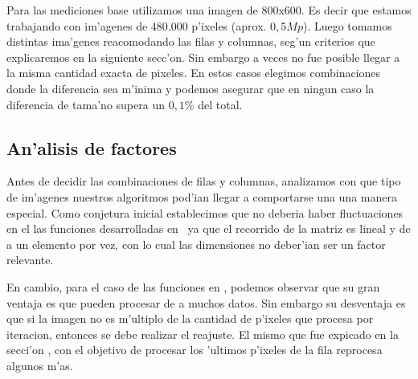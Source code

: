 Para las mediciones base utilizamos una imagen de 800x600. Es decir que estamos trabajando con im'agenes de 480.000 p'ixeles (aprox. $0,5Mp$). Luego tomamos distintas ima'genes reacomodando las filas y columnas, seg'un criterios que explicaremos en la siguiente secc'on. Sin embargo a veces no fue posible llegar a la misma cantidad exacta de pixeles. En estos casos elegimos combinaciones donde la diferencia sea m'inima y podemos asegurar que en ningun caso la diferencia de tama'no supera un $0,1\%$ del total.

\subsection{An'alisis de factores}
Antes de decidir las combinaciones de filas y columnas, analizamos con que tipo de im'agenes nuestros algoritmos pod'ian
llegar a comportarse una una manera especial. Como conjetura inicial establecimos que no deberia haber 
fluctuaciones en el las funciones desarrolladas en \C \ ya que el recorrido de la matriz es lineal y
de a un elemento por vez, con lo cual las dimensiones no deber'ian ser un factor relevante. 

En cambio, para el caso de las funciones en \ass, podemos observar que su gran ventaja es que pueden procesar de a muchos datos. Sin embargo su desventaja es que si la imagen no es m'ultiplo de la cantidad de p'ixeles que procesa por iteracion, entonces se debe realizar el reajuste. El mismo que fue expicado en la secci'on \label{sec:ciclos}, con el objetivo de procesar los 'ultimos p'ixeles de la fila reprocesa algunos m'as. 

%

